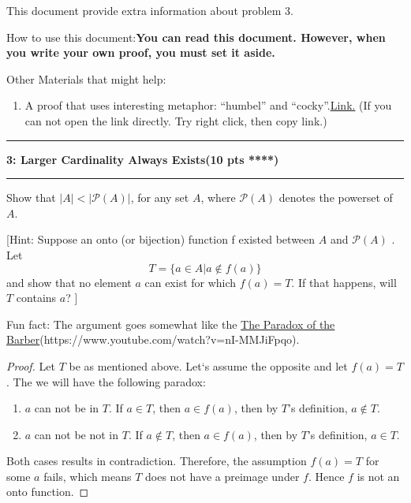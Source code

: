 \documentclass[11pt]{article}
\newcommand\question[2]{\vspace{.25in}\hrule\textbf{#1: #2}\vspace{.5em}\hrule\vspace{.10in}}
\begin{document}
\raggedright
\newcommand\NAME{Xiang Huang}  %
\newcommand\UISID{\texttt{UISid}}     %
\newcommand\HWNUM{3}              %


This document provide extra information about problem 3.

How to use this document:\textbf{You can read this document. However, when you write your own proof, you must set it aside.}

Other Materials that might help:
\begin{enumerate}
    \item A proof that uses interesting metaphor: ``humbel'' and ``cocky''.\href{http://mathcenter.oxford.emory.edu/site/math125/powerSetCardinality/}{Link.} (If you can not open the link directly. Try right click, then copy link.)
\end{enumerate}




\question{3}{Larger Cardinality Always Exists(10 pts ****)}
Show that $|A|< |\mathcal{P}(A)|$, for any set $A$, where $\mathcal{P}(A)$ denotes the powerset of $A$.

[Hint: Suppose an onto (or bijection) function f existed between $A$ and $\mathcal{P}(A)$ . Let \[
    T=\{a\in A|a\not\in f(a)\}
\]and show that no element $a$ can
exist for which $f(a)=T$. If that happens, will $T$ contains $a$?  ]

Fun fact: The argument goes somewhat like the \href{https://www.youtube.com/watch?v=nI-MMJiFpqo}{The Paradox of the Barber}(https://www.youtube.com/watch?v=nI-MMJiFpqo).


\begin{proof}
    Let $T$ be as mentioned above.
    Let`s assume the opposite and let $f(a)= T$. The we will have the following paradox:
     \begin{enumerate}
         \item $a$ can not be in $T$.  If $a\in T$, then $a\in f(a)$, then by $T$'s definition, $a\not \in T$.
         \item $a$ can not be not in $T$. If $a\not \in T$, then $a\in f(a)$, then by $T$'s definition, $a\in T$.
     \end{enumerate}
     Both cases results in contradiction.
     Therefore, the assumption $f(a)=T$ for some $a$ fails, which means $T$ does not have a preimage under $f$. Hence $f$ is not an onto function.
\end{proof}
\end{document}
